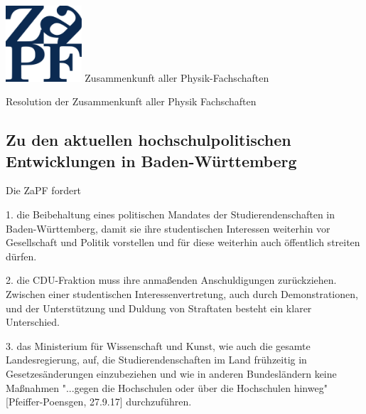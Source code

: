 \documentclass[DIV=calc]{scrartcl}
\begin{document}
    \hspace{0.87\textwidth}
    \begin{minipage}{120pt}
        \vspace{-1.8cm}
        \includegraphics[width=80pt]{../../logo.pdf}
        \centering
        \small Zusammenkunft aller Physik-Fachschaften
    \end{minipage}
    \begin{center}
        \huge{Resolution der Zusammenkunft aller Physik Fachschaften}\vspace{.25\baselineskip}\\
        \normalsize
    \end{center}
    \vspace{1cm}    %
    
\subsection*{Zu den aktuellen hochschulpolitischen Entwicklungen in Baden-Württemberg}    
Die ZaPF fordert

1. die Beibehaltung eines politischen Mandates der Studierendenschaften in Baden-Württemberg, damit sie ihre studentischen Interessen weiterhin vor Gesellschaft und Politik vorstellen und für diese weiterhin auch öffentlich streiten dürfen.

2. die CDU-Fraktion muss ihre anmaßenden Anschuldigungen zurückziehen. Zwischen einer studentischen Interessenvertretung, auch durch Demonstrationen, und der Unterstützung und Duldung von Straftaten besteht ein klarer Unterschied. 

3. das Ministerium für Wissenschaft und Kunst, wie auch die gesamte Landesregierung, auf, die Studierendenschaften im Land frühzeitig in Gesetzesänderungen einzubeziehen und wie in anderen Bundesländern keine Maßnahmen "...gegen die Hochschulen oder über die Hochschulen hinweg" [Pfeiffer-Poensgen, 27.9.17] durchzuführen.
\end{document}
